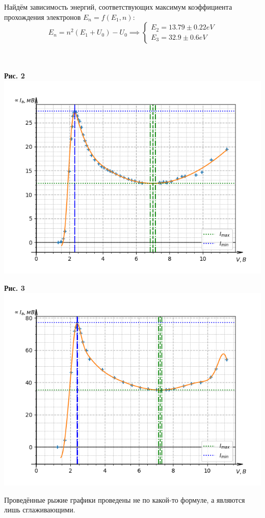 \documentclass[a4paper, 12pt]{article}%
\begin{document}
	Найдём зависимость энергий, соответствующих максимум коэффициента прохождения электронов $E_n = f(E_1, n)$:
	\[E_n = n^2\left(E_1+U_0\right)-U_0 \implies 
	\begin{cases}
		E_2 = 13.79 \pm 0.22 eV \\
		E_3 = 32.9 \pm 0.6 eV
	\end{cases}\] \\ \\
	\newpage
	\begin{center}
		\textbf{Рис.  2}\\
		\includegraphics[width=0.75\linewidth]{Figure_1.png}
	\end{center}

	\begin{center}
		\textbf{Рис. 3}\\
		\includegraphics[width=0.75\linewidth]{Figure_2.png}
	\end{center}

	Проведённые рыжие графики проведены не по какой-то формуле, а являются лишь сглаживающими.
\end{document}
